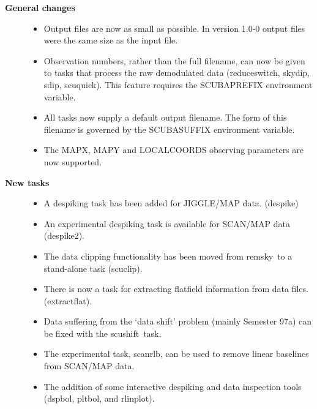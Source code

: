 \documentclass[twoside,11pt]{article}
\newcommand{\task}[1]{{\sf #1}}
\newcommand{\resw}{\htmlref{\task{reduce\_switch}}{REDUCE_SWITCH}}
\newcommand{\skydip}{\htmlref{\task{skydip}}{SKYDIP}}
\newcommand{\scuquick}{\htmlref{\task{scuquick}}{SCUQUICK}}
\newcommand{\remsky}{\htmlref{\task{remsky}}{REMSKY}}
\newcommand{\sdip}{\htmlref{\task{sdip}}{SDIP}}
\newcommand{\despike}{\htmlref{\task{despike}}{DESPIKE}}
\newcommand{\despikeb}{\htmlref{\task{despike2}}{DESPIKE2}}
\newcommand{\extflat}{\htmlref{\task{extract\_flat}}{EXTRACT_FLAT}}
\newcommand{\scushift}{\htmlref{\task{scushift}}{SCUSHIFT}}
\newcommand{\scuclip}{\htmlref{\task{scuclip}}{SCUCLIP}}
\newcommand{\scanrlb}{\htmlref{\task{scan\_rlb}}{SCAN_RLB}}
\newcommand{\dspbol}{\htmlref{\task{dspbol}}{DSPBOL}}
\newcommand{\pltbol}{\htmlref{\task{pltbol}}{PLTBOL}}
\newcommand{\rlinplot}{\htmlref{\task{rlinplot}}{RLINPLOT}}
\newcommand{\htmlref}[2]{#1}
\renewcommand{\_}{\texttt{\symbol{95}}}
\begin{document}
\begin{description}

\item[\textbf{General changes}] \mbox{}

\begin{itemize}
\item Output files are now as small as possible. In version 1.0-0 output files 
were the same size as the input file.

\item Observation numbers, rather than the full filename, can now be given to
 tasks that process the raw demodulated data (\resw, \skydip, \sdip,
 \scuquick). This feature requires the SCUBA\_PREFIX environment variable.

\item All tasks now supply a default output filename. The form of this
filename is governed by the SCUBA\_SUFFIX environment variable.

\item The MAP\_X, MAP\_Y and LOCAL\_COORDS observing parameters are now
supported. 

\end{itemize}


\item[\textbf{New tasks}] \mbox{}

\begin{itemize}

\item A despiking task has been added for JIGGLE/MAP data. (\despike)

\item An experimental despiking task is available for SCAN/MAP data
(\despikeb). 

\item The data clipping functionality has been moved from \remsky\ to a
stand-alone task (\scuclip).

\item There is now a task for extracting flatfield information from data
files. (\extflat).

\item Data suffering from the `data shift' problem (mainly Semester 97a)
can be fixed with the \scushift\ task.

\item The experimental task, \scanrlb, can be used to remove linear baselines
from SCAN/MAP data.

\item The addition of some interactive despiking and data inspection tools
(\dspbol, \pltbol, and \rlinplot).


\end{itemize}
\end{description}
\end{document}
